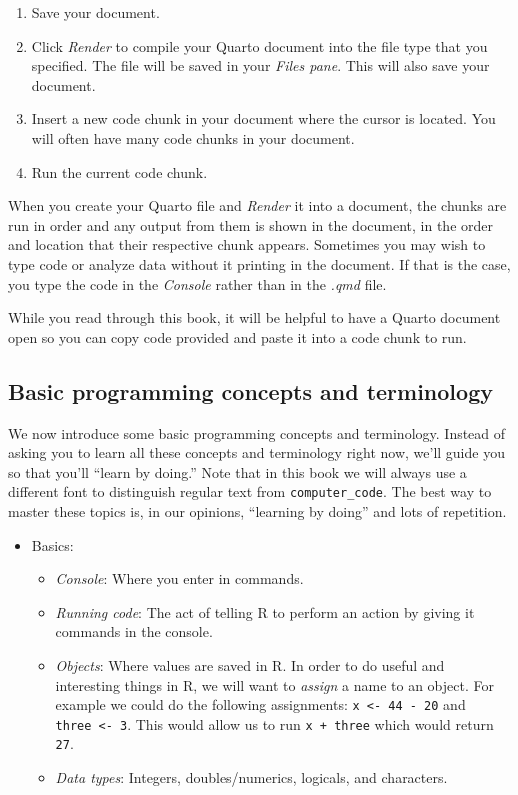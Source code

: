 \documentclass[
  letterpaper,
  DIV=11,
  numbers=noendperiod]{scrreprt}
\providecommand{\tightlist}{%
  \setlength{\itemsep}{0pt}\setlength{\parskip}{0pt}}\usepackage{longtable,booktabs,array}
\theoremstyle{definition}
\theoremstyle{remark}
\begin{document}
\begin{enumerate}
\def\labelenumi{\alph{enumi})}
\tightlist
\item
  Save your document.
\item
  Click \emph{Render} to compile your Quarto document into the file type
  that you specified. The file will be saved in your \emph{Files pane}.
  This will also save your document.
\item
  Insert a new code chunk in your document where the cursor is located.
  You will often have many code chunks in your document.
\item
  Run the current code chunk.
\end{enumerate}

When you create your Quarto file and \emph{Render} it into a document,
the chunks are run in order and any output from them is shown in the
document, in the order and location that their respective chunk appears.
Sometimes you may wish to type code or analyze data without it printing
in the document. If that is the case, you type the code in the
\emph{Console} rather than in the \emph{.qmd} file.

While you read through this book, it will be helpful to have a Quarto
document open so you can copy code provided and paste it into a code
chunk to run.

\hypertarget{sec-programming-concepts}{%
\subsection{Basic programming concepts and
terminology}\label{sec-programming-concepts}}

We now introduce some basic programming concepts and terminology.
Instead of asking you to learn all these concepts and terminology right
now, we'll guide you so that you'll ``learn by doing.'' Note that in
this book we will always use a different font to distinguish regular
text from \texttt{computer\_code}. The best way to master these topics
is, in our opinions, ``learning by doing'' and lots of repetition.

\begin{itemize}
\item
  Basics:

  \begin{itemize}
  \tightlist
  \item
    \emph{Console}: Where you enter in commands. 
  \item
    \emph{Running code}: The act of telling R to perform an action by
    giving it commands in the console.
  \item
    \emph{Objects}: Where values are saved in R. In order to do useful
    and interesting things in R, we will want to \emph{assign} a name to
    an object. For example we could do the following assignments:
    \texttt{x\ \textless{}-\ 44\ -\ 20} and
    \texttt{three\ \textless{}-\ 3}. This would allow us to run
    \texttt{x\ +\ three} which would return \texttt{27}.
  \item
    \emph{Data types}: Integers, doubles/numerics, logicals, and
    characters.
  \end{itemize}
\end{itemize}
\end{document}
